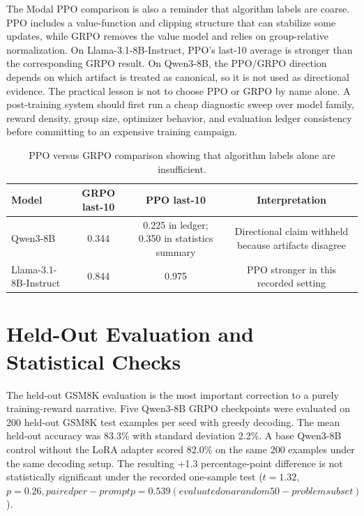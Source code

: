 \documentclass[12pt,a4paper]{report}
\begin{document}
The Modal PPO comparison is also a reminder that algorithm labels are coarse. PPO includes a value-function and clipping structure that can stabilize some updates, while GRPO removes the value model and relies on group-relative normalization. On Llama-3.1-8B-Instruct, PPO's last-10 average is stronger than the corresponding GRPO result. On Qwen3-8B, the PPO/GRPO direction depends on which artifact is treated as canonical, so it is not used as directional evidence. The practical lesson is not to choose PPO or GRPO by name alone. A post-training system should first run a cheap diagnostic sweep over model family, reward density, group size, optimizer behavior, and evaluation ledger consistency before committing to an expensive training campaign.

\begin{table}[ht]
\centering
\caption{PPO versus GRPO comparison showing that algorithm labels alone are insufficient.}
\label{tab:ppo-grpo}
\begin{tabular}{lccc}
\toprule
Model & GRPO last-10 & PPO last-10 & Interpretation\\
\midrule
Qwen3-8B & 0.344 & 0.225 in ledger; 0.350 in statistics summary & Directional claim withheld because artifacts disagree\\
Llama-3.1-8B-Instruct & 0.844 & 0.975 & PPO stronger in this recorded setting\\
\bottomrule
\end{tabular}
\end{table}

\section{Held-Out Evaluation and Statistical Checks}
\label{sec:heldout-evaluation}

The held-out GSM8K evaluation is the most important correction to a purely training-reward narrative. Five Qwen3-8B GRPO checkpoints were evaluated on 200 held-out GSM8K test examples per seed with greedy decoding. The mean held-out accuracy was 83.3\% with standard deviation 2.2\%. A base Qwen3-8B control without the LoRA adapter scored 82.0\% on the same 200 examples under the same decoding setup. The resulting +1.3 percentage-point difference is not statistically significant under the recorded one-sample test ($t=1.32$, $p=0.26, paired per-prompt p=0.539 (evaluated on a random 50-problem subset)$).
\end{document}
